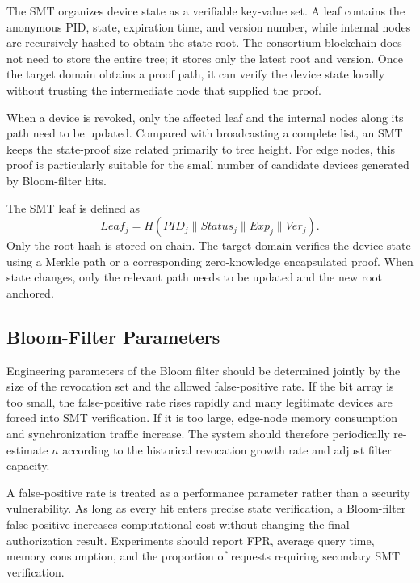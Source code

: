 \documentclass[lettersize,journal]{IEEEtran}
\begin{document}
	The SMT organizes device state as a verifiable key-value set. A leaf contains the anonymous PID, state, expiration time, and version number, while internal nodes are recursively hashed to obtain the state root. The consortium blockchain does not need to store the entire tree; it stores only the latest root and version. Once the target domain obtains a proof path, it can verify the device state locally without trusting the intermediate node that supplied the proof.
	
	When a device is revoked, only the affected leaf and the internal nodes along its path need to be updated. Compared with broadcasting a complete list, an SMT keeps the state-proof size related primarily to tree height. For edge nodes, this proof is particularly suitable for the small number of candidate devices generated by Bloom-filter hits.
	
	The SMT leaf is defined as
	\begin{equation}
		Leaf_j=H(PID_j\parallel Status_j\parallel Exp_j\parallel Ver_j).
	\end{equation}
	Only the root hash is stored on chain. The target domain verifies the device state using a Merkle path or a corresponding zero-knowledge encapsulated proof. When state changes, only the relevant path needs to be updated and the new root anchored.
	
	\subsection{Bloom-Filter Parameters}
	
	Engineering parameters of the Bloom filter should be determined jointly by the size of the revocation set and the allowed false-positive rate. If the bit array is too small, the false-positive rate rises rapidly and many legitimate devices are forced into SMT verification. If it is too large, edge-node memory consumption and synchronization traffic increase. The system should therefore periodically re-estimate $n$ according to the historical revocation growth rate and adjust filter capacity.
	
	A false-positive rate is treated as a performance parameter rather than a security vulnerability. As long as every hit enters precise state verification, a Bloom-filter false positive increases computational cost without changing the final authorization result. Experiments should report FPR, average query time, memory consumption, and the proportion of requests requiring secondary SMT verification.
	
\end{document}
